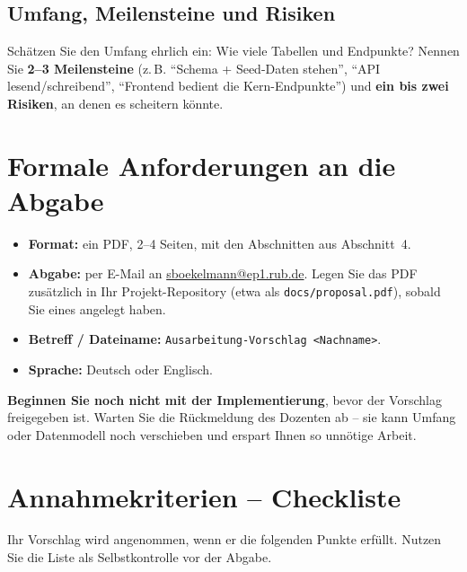 \documentclass[11pt,a4paper]{article}
\begin{document}
\subsection{Umfang, Meilensteine und Risiken}

Schätzen Sie den Umfang ehrlich ein: Wie viele Tabellen und Endpunkte? Nennen
Sie \textbf{2--3 Meilensteine} (z.\,B. ``Schema + Seed-Daten stehen'', ``API
lesend/schreibend'', ``Frontend bedient die Kern-Endpunkte'') und \textbf{ein
bis zwei Risiken}, an denen es scheitern könnte.

\section{Formale Anforderungen an die Abgabe}

\begin{itemize}[leftmargin=1.4em]
  \item \textbf{Format:} ein PDF, 2--4 Seiten, mit den Abschnitten aus
        Abschnitt~4.
  \item \textbf{Abgabe:} per E-Mail an
        \href{mailto:sboekelmann@ep1.rub.de}{sboekelmann@ep1.rub.de}. Legen Sie
        das PDF zusätzlich in Ihr Projekt-Repository (etwa als
        \texttt{docs/proposal.pdf}), sobald Sie eines angelegt haben.
  \item \textbf{Betreff / Dateiname:} \texttt{Ausarbeitung-Vorschlag
        <Nachname>}.
  \item \textbf{Sprache:} Deutsch oder Englisch.
\end{itemize}

\begin{warnbox}
\textbf{Beginnen Sie noch nicht mit der Implementierung}, bevor der Vorschlag
freigegeben ist. Warten Sie die Rückmeldung des Dozenten ab -- sie kann Umfang
oder Datenmodell noch verschieben und erspart Ihnen so unnötige Arbeit.
\end{warnbox}

\section{Annahmekriterien -- Checkliste}

Ihr Vorschlag wird angenommen, wenn er die folgenden Punkte erfüllt. Nutzen Sie
die Liste als Selbstkontrolle vor der Abgabe.
\end{document}
